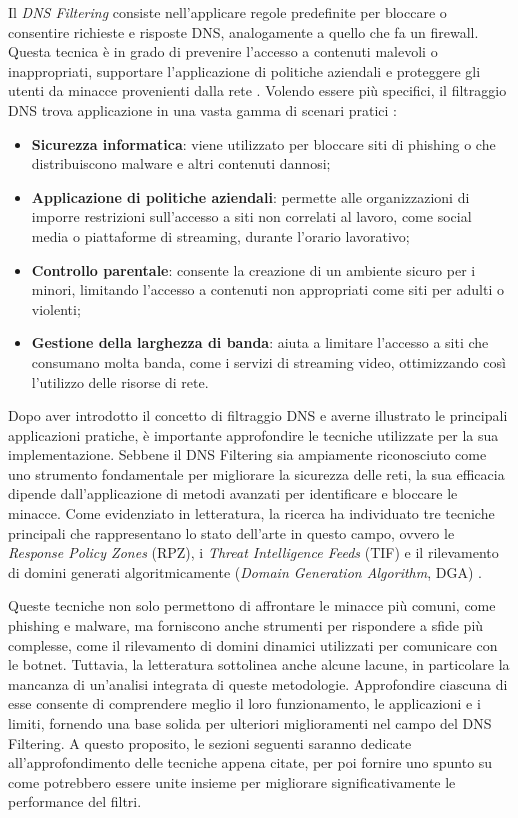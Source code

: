 Il \textit{DNS Filtering} consiste nell'applicare regole predefinite per bloccare o consentire richieste e risposte DNS, analogamente a quello che fa un firewall. Questa tecnica è in grado di prevenire l'accesso a contenuti malevoli o inappropriati, supportare l'applicazione di politiche aziendali e proteggere gli utenti da minacce provenienti dalla rete \cite{Magnusson2024}. Volendo essere più specifici, il filtraggio DNS trova applicazione in una vasta gamma di scenari pratici \cite{Murdoch2008, Varadharajan2010}:
\begin{itemize}
  \item \textbf{Sicurezza informatica}: viene utilizzato per bloccare siti di phishing o che distribuiscono malware e altri contenuti dannosi;

  \item \textbf{Applicazione di politiche aziendali}: permette alle organizzazioni di imporre restrizioni sull'accesso a siti non correlati al lavoro, come social media o piattaforme di streaming, durante l'orario lavorativo;

  \item \textbf{Controllo parentale}: consente la creazione di un ambiente sicuro per i minori, limitando l'accesso a contenuti non appropriati come siti per adulti o violenti;

  \item \textbf{Gestione della larghezza di banda}: aiuta a limitare l'accesso a siti che consumano molta banda, come i servizi di streaming video, ottimizzando così l'utilizzo delle risorse di rete.
\end{itemize}

Dopo aver introdotto il concetto di filtraggio DNS e averne illustrato le principali applicazioni pratiche, è importante approfondire le tecniche utilizzate per la sua implementazione. Sebbene il DNS Filtering sia ampiamente riconosciuto come uno strumento fondamentale per migliorare la sicurezza delle reti, la sua efficacia dipende dall'applicazione di metodi avanzati per identificare e bloccare le minacce. Come evidenziato in letteratura, la ricerca ha individuato tre tecniche principali che rappresentano lo stato dell'arte in questo campo, ovvero le \textit{Response Policy Zones} (RPZ), i \textit{Threat Intelligence Feeds} (TIF) e il rilevamento di domini generati algoritmicamente (\textit{Domain Generation Algorithm}, DGA) \cite{Magnusson2024}.

Queste tecniche non solo permettono di affrontare le minacce più comuni, come phishing e malware, ma forniscono anche strumenti per rispondere a sfide più complesse, come il rilevamento di domini dinamici utilizzati per comunicare con le botnet. Tuttavia, la letteratura sottolinea anche alcune lacune, in particolare la mancanza di un'analisi integrata di queste metodologie. Approfondire ciascuna di esse consente di comprendere meglio il loro funzionamento, le applicazioni e i limiti, fornendo una base solida per ulteriori miglioramenti nel campo del DNS Filtering. A questo proposito, le sezioni seguenti saranno dedicate all'approfondimento delle tecniche appena citate, per poi fornire uno spunto su come potrebbero essere unite insieme per migliorare significativamente le performance del filtri.

